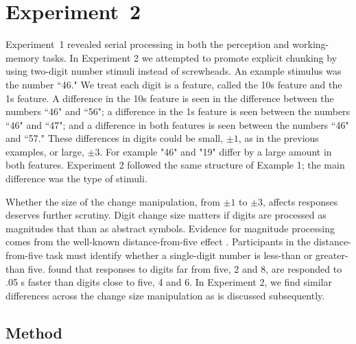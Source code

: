 \documentclass[fignum,nobf,man]{apa}
\begin{document}
%




\section{Experiment~2}
Experiment~1 revealed serial processing in both the perception and working-memory tasks.  In Experiment 2 we attempted to promote explicit chunking by using two-digit number stimuli instead of screwheads.  An example stimulus was the number  ``46."   We treat each digit is a feature, called the 10s feature and the 1s feature.  A  difference in the 10s feature is seen in the difference between the numbers ``46" and ``56"; a difference in the 1s feature is seen between the numbers ``46" and ``47"; and a difference in both features is seen between the numbers ``46" and ``57."  These differences in digits could be small, $\pm1$, as in the previous examples, or large, $\pm3$.  For example "46" and "19" differ by a large amount in both features.    Experiment 2 followed the same structure of Example 1; the main difference was the type of stimuli.

Whether the size of the change manipulation, from $\pm1$ to $\pm3$, affects responses deserves further scrutiny.   Digit change size matters if digits are processed as magnitudes that than as abstract symbols.  Evidence for magnitude processing comes from the well-known distance-from-five effect \citep{Moyer:Landauer:1967}.   Participants in the distance-from-five task must identify whether a single-digit number is less-than or greater-than five.  \citet{Rouder:etal:2005a} found that responses to digits far from five, 2 and 8, are responded to .05 s faster than digits close to five, 4 and 6.  In Experiment 2, we find similar differences across the change size manipulation as is discussed subsequently. 

\subsection{Method}
\end{document}
